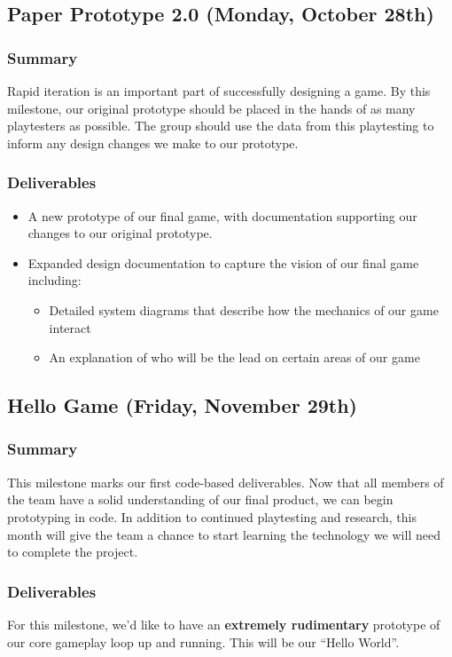 \subsection{Paper Prototype 2.0 (Monday, October 28th)}

\subsubsection*{Summary}
Rapid iteration is an important part of successfully designing a game. By this
milestone, our original prototype should be placed in the hands of as many
playtesters as possible. The group should use the data from this playtesting to
inform any design changes we make to our prototype.

\subsubsection*{Deliverables}
\begin{itemize}
  \item A new prototype of our final game, with documentation supporting our
  changes to our original prototype.
  \item Expanded design documentation to capture the vision of our final game
  including:
  \begin{itemize}
    \item Detailed system diagrams that describe how the mechanics of our game
    interact
    \item An explanation of who will be the lead on certain areas of our game
  \end{itemize}
\end{itemize}

\subsection{Hello Game (Friday, November 29th)}

\subsubsection*{Summary}
This milestone marks our first code-based deliverables. Now that all members of
the team have a solid understanding of our final product, we can begin
prototyping in code. In addition to continued playtesting and research, this
month will give the team a chance to start learning the technology we will need
to complete the project.

\subsubsection*{Deliverables}
For this milestone, we’d like to have an \textbf{extremely rudimentary} prototype
of our core gameplay loop up and running. This will be our “Hello World”.

